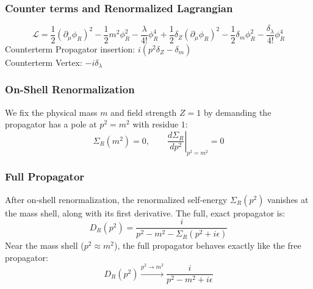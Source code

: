 \documentclass{article}
\begin{document}
\subsubsection*{Counter terms and Renormalized Lagrangian}
\begin{equation}
    \mathcal{L} = \frac{1}{2}(\partial_\mu \phi_R)^2 - \frac{1}{2}m^2\phi_R^2 - \frac{\lambda}{4!}\phi_R^4 + \frac{1}{2}\delta_Z (\partial_\mu \phi_R)^2 - \frac{1}{2}\delta_m \phi_R^2 - \frac{\delta_\lambda}{4!}\phi_R^4
\end{equation}
Counterterm Propagator insertion: $i(p^2 \delta_Z - \delta_m)$ \\
Counterterm Vertex: $-i\delta_\lambda$
\subsubsection*{On-Shell Renormalization}
We fix the physical mass $m$ and field strength $Z=1$ by demanding the propagator has a pole at $p^2=m^2$ with residue $1$:
\begin{equation}
    \Sigma_R(m^2) = 0, \qquad \left.\frac{d\Sigma_R}{dp^2}\right|_{p^2=m^2} = 0
\end{equation}
\subsubsection*{Full Propagator}
After on-shell renormalization, the renormalized self-energy $\Sigma_R(p^2)$ vanishes at the mass shell, along with its first derivative. The full, exact propagator is:
\begin{equation}
    D_R(p^2) = \frac{i}{p^2 - m^2 - \Sigma_R(p^2 + i\epsilon)}
\end{equation}
Near the mass shell ($p^2 \approx m^2$), the full propagator behaves exactly like the free propagator:
\begin{equation}
    D_R(p^2) \xrightarrow{p^2 \to m^2} \frac{i}{p^2 - m^2 + i\epsilon}
\end{equation}
\end{document}
